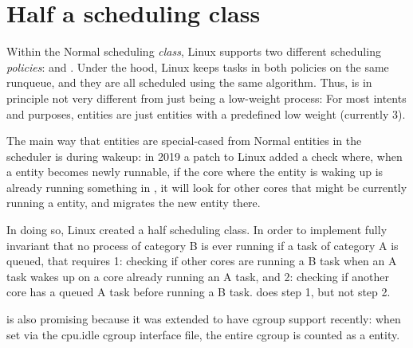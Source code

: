
\section{Half a scheduling class}
\label{sec:sched-idle}

Within the Normal scheduling \textit{class}, Linux supports two different
scheduling \textit{policies}: \schednormal{} and \schedidle{}. Under the hood,
Linux keeps tasks in both policies on the same runqueue, and they are all
scheduled using the same algorithm. Thus, \schedidle{} is in principle not very
different from just being a low-weight process: For most intents and purposes,
\schedidle{} entities are just entities with a predefined low weight (currently
3).

The main way that \schedidle{} entities are special-cased from Normal entities
in the scheduler is during wakeup: in 2019 a patch to Linux added a check where,
when a \schednormal{} entity becomes newly runnable, if the core where the
entity is waking up is already running something in \schednormal{}, it will look
for other cores that might be currently running a \schedidle{} entity, and
migrates the new entity there.

In doing so, Linux created a half scheduling class. In order to implement fully
invariant that no process of category B is ever running if a task of category A
is queued, that requires 1: checking if other cores are running a B task when an
A task wakes up on a core already running an A task, and 2: checking if another
core has a queued A task before running a B task. \schedidle{} does step 1, but
not step 2.

\schedidle{} is also promising because it was extended to have cgroup support
recently: when set via the cpu.idle cgroup interface file, the entire cgroup is
counted as a \schedidle{} entity.

